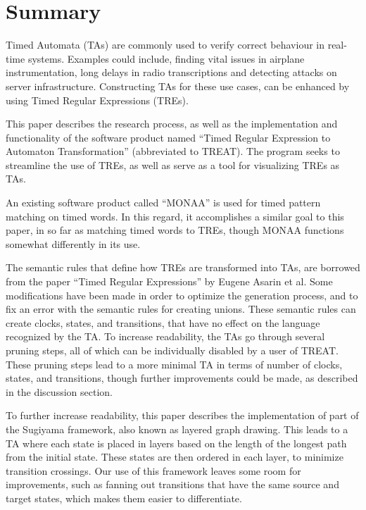 \section*{Summary}
\thispagestyle{empty}

Timed Automata (TAs) are commonly used to verify correct behaviour in real-time systems. Examples could include, finding vital issues in airplane instrumentation, long delays in radio transcriptions and detecting attacks on server infrastructure. Constructing TAs for these use cases, can be enhanced by using Timed Regular Expressions (TREs).

This paper describes the research process, as well as the implementation and functionality of the software product named ``Timed Regular Expression to Automaton Transformation'' (abbreviated to TREAT).
The program seeks to streamline the use of TREs, as well as serve as a tool for visualizing TREs as TAs.

An existing software product called ``MONAA'' is used for timed pattern matching on timed words. In this regard, it accomplishes a similar goal to this paper, in so far as matching timed words to TREs, though MONAA functions somewhat differently in its use.

The semantic rules that define how TREs are transformed into TAs, are borrowed from the paper ``Timed Regular Expressions'' by Eugene Asarin et al. Some modifications have been made in order to optimize the generation process, and to fix an error with the semantic rules for creating unions. These semantic rules can create clocks, states, and transitions, that have no effect on the language recognized by the TA. To increase readability, the TAs go through several pruning steps, all of which can be individually disabled by a user of TREAT.
These pruning steps lead to a more minimal TA in terms of number of clocks, states, and transitions, though further improvements could be made, as described in the discussion section.

To further increase readability, this paper describes the implementation of part of the Sugiyama framework, also known as layered graph drawing. This leads to a TA where each state is placed in layers based on the length of the longest path from the initial state. These states are then ordered in each layer, to minimize transition crossings. Our use of this framework leaves some room for improvements, such as fanning out transitions that have the same source and target states, which makes them easier to differentiate.

